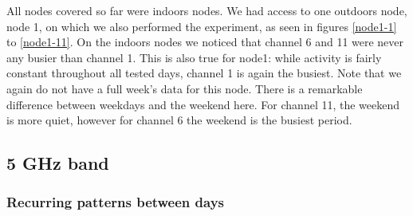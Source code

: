 \documentclass[a4paper, 11pt]{article}
\begin{document}
All nodes covered so far were indoors nodes. We had access to one outdoors node, node 1, on which we also performed the experiment, as seen in figures \ref{node1-1} to \ref{node1-11}. On the indoors nodes we noticed that channel 6 and 11 were never any busier than channel 1. This is also true for node1: while activity is fairly constant throughout all tested days, channel 1 is again the busiest. Note that we again do not have a full week's data for this node. There is a remarkable difference between weekdays and the weekend here. For channel 11, the weekend is more quiet, however for channel 6 the weekend is the busiest period.


\subsection{5 GHz band}
\subsubsection{Recurring patterns between days}
\end{document}
